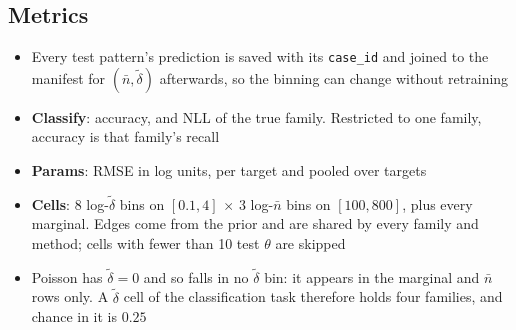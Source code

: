 \documentclass[11pt]{article}
\newcommand{\dt}{\tilde\delta}
\newcommand{\nb}{\bar n}
\begin{document}
\subsection*{Metrics}
\begin{itemize}
  \item Every test pattern's prediction is saved with its \texttt{case\_id} and joined to the manifest for $(\nb,\dt)$ afterwards, so the binning can change without retraining
  \item \textbf{Classify}: accuracy, and NLL of the true family. Restricted to one family, accuracy is that family's recall
  \item \textbf{Params}: RMSE in log units, per target and pooled over targets
  \item \textbf{Cells}: 8 log-$\dt$ bins on $[0.1,4]$ $\times$ 3 log-$\nb$ bins on $[100,800]$, plus every marginal. Edges come from the prior and are shared by every family and method; cells with fewer than 10 test $\theta$ are skipped
  \item Poisson has $\dt=0$ and so falls in no $\dt$ bin: it appears in the marginal and $\nb$ rows only. A $\dt$ cell of the classification task therefore holds four families, and chance in it is $0.25$
\end{itemize}
\end{document}
